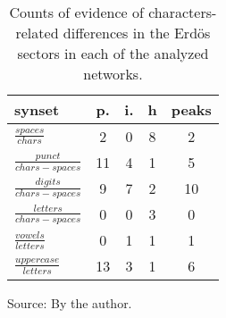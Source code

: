 \begin{table}[h!]
\begin{center}
\caption{Counts of evidence of characters-related differences in the Erd\"os sectors in each of the analyzed networks.}
	\def\arraystretch{1.5}
\begin{tabular}{l || c | c | c || c}\hline
{\bf synset} & {\bf p.} & {\bf i.} & {\bf h} & {\bf peaks} \\\hline\hline
$\frac{spaces}{chars}$ & 2  & 0  & 8  & 2 \\
$\frac{punct}{chars-spaces}$ & 11  & 4  & 1  & 5 \\
$\frac{digits}{chars-spaces}$ & 9  & 7  & 2  & 10 \\\hline
$\frac{letters}{chars-spaces}$ & 0  & 0  & 3  & 0 \\
$\frac{vowels}{letters}$ & 0  & 1  & 1  & 1 \\
$\frac{uppercase}{letters}$ & 13  & 3  & 1  & 6 \\\hline
\end{tabular}
\begin{flushleft}\footnotesize
		Source: By the author.\
\end{flushleft}
\end{center}
\end{table}
